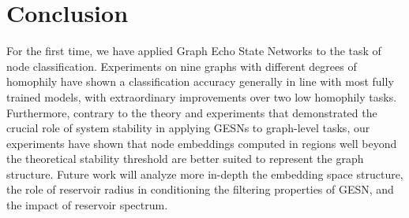 \documentclass{esannV2p}
\begin{document}
\section{Conclusion}\label{sec:conclusion}
For the first time, we have applied Graph Echo State Networks to the task of node classification.
Experiments on nine graphs with different degrees of homophily have shown a classification accuracy generally in line with most fully trained models, with extraordinary improvements over two low homophily tasks.
Furthermore, contrary to the theory and experiments that demonstrated the crucial role of system stability in applying GESNs to graph-level tasks, our experiments have shown that node embeddings computed in regions well beyond the theoretical stability threshold are better suited to represent the graph structure.
Future work will analyze more in-depth the embedding space structure, the role of reservoir radius in conditioning the filtering properties of GESN, and the impact of reservoir spectrum.


\begin{footnotesize}





\end{footnotesize}
\end{document}
